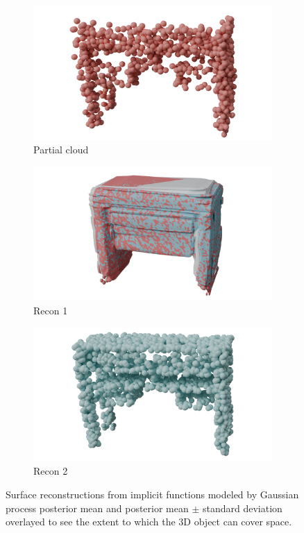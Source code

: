 \begin{figure}[htb]
\centering
\begin{subfigure}{0.315\textwidth}
    \includegraphics[width=\linewidth]{figures/gp/t1pgp.png}
    \caption{Partial cloud}
\end{subfigure}
\hfill
\begin{subfigure}{0.315\textwidth}
    \includegraphics[width=\linewidth]{figures/gp/t1gp+-.png}
    \caption{Recon 1}
\end{subfigure}
\hfill
\begin{subfigure}{0.315\textwidth}
    \includegraphics[width=\linewidth]{figures/gp/t1cgp.png}
    \caption{Recon 2}
\end{subfigure}
\caption{Surface reconstructions from implicit functions modeled by Gaussian process posterior mean and posterior mean $\pm$ standard deviation overlayed to see the extent to which the 3D object can cover space.}
\label{fig:one-std-gp}
\end{figure}


